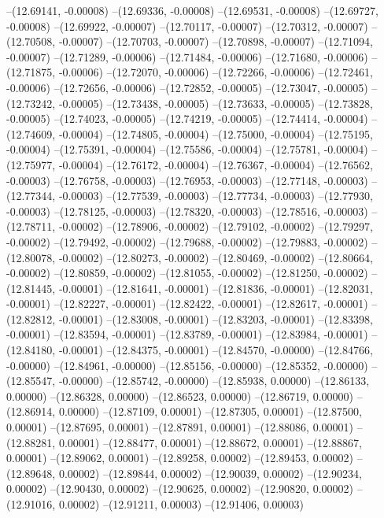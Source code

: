 --(12.69141, -0.00008)
--(12.69336, -0.00008)
--(12.69531, -0.00008)
--(12.69727, -0.00008)
--(12.69922, -0.00007)
--(12.70117, -0.00007)
--(12.70312, -0.00007)
--(12.70508, -0.00007)
--(12.70703, -0.00007)
--(12.70898, -0.00007)
--(12.71094, -0.00007)
--(12.71289, -0.00006)
--(12.71484, -0.00006)
--(12.71680, -0.00006)
--(12.71875, -0.00006)
--(12.72070, -0.00006)
--(12.72266, -0.00006)
--(12.72461, -0.00006)
--(12.72656, -0.00006)
--(12.72852, -0.00005)
--(12.73047, -0.00005)
--(12.73242, -0.00005)
--(12.73438, -0.00005)
--(12.73633, -0.00005)
--(12.73828, -0.00005)
--(12.74023, -0.00005)
--(12.74219, -0.00005)
--(12.74414, -0.00004)
--(12.74609, -0.00004)
--(12.74805, -0.00004)
--(12.75000, -0.00004)
--(12.75195, -0.00004)
--(12.75391, -0.00004)
--(12.75586, -0.00004)
--(12.75781, -0.00004)
--(12.75977, -0.00004)
--(12.76172, -0.00004)
--(12.76367, -0.00004)
--(12.76562, -0.00003)
--(12.76758, -0.00003)
--(12.76953, -0.00003)
--(12.77148, -0.00003)
--(12.77344, -0.00003)
--(12.77539, -0.00003)
--(12.77734, -0.00003)
--(12.77930, -0.00003)
--(12.78125, -0.00003)
--(12.78320, -0.00003)
--(12.78516, -0.00003)
--(12.78711, -0.00002)
--(12.78906, -0.00002)
--(12.79102, -0.00002)
--(12.79297, -0.00002)
--(12.79492, -0.00002)
--(12.79688, -0.00002)
--(12.79883, -0.00002)
--(12.80078, -0.00002)
--(12.80273, -0.00002)
--(12.80469, -0.00002)
--(12.80664, -0.00002)
--(12.80859, -0.00002)
--(12.81055, -0.00002)
--(12.81250, -0.00002)
--(12.81445, -0.00001)
--(12.81641, -0.00001)
--(12.81836, -0.00001)
--(12.82031, -0.00001)
--(12.82227, -0.00001)
--(12.82422, -0.00001)
--(12.82617, -0.00001)
--(12.82812, -0.00001)
--(12.83008, -0.00001)
--(12.83203, -0.00001)
--(12.83398, -0.00001)
--(12.83594, -0.00001)
--(12.83789, -0.00001)
--(12.83984, -0.00001)
--(12.84180, -0.00001)
--(12.84375, -0.00001)
--(12.84570, -0.00000)
--(12.84766, -0.00000)
--(12.84961, -0.00000)
--(12.85156, -0.00000)
--(12.85352, -0.00000)
--(12.85547, -0.00000)
--(12.85742, -0.00000)
--(12.85938, 0.00000)
--(12.86133, 0.00000)
--(12.86328, 0.00000)
--(12.86523, 0.00000)
--(12.86719, 0.00000)
--(12.86914, 0.00000)
--(12.87109, 0.00001)
--(12.87305, 0.00001)
--(12.87500, 0.00001)
--(12.87695, 0.00001)
--(12.87891, 0.00001)
--(12.88086, 0.00001)
--(12.88281, 0.00001)
--(12.88477, 0.00001)
--(12.88672, 0.00001)
--(12.88867, 0.00001)
--(12.89062, 0.00001)
--(12.89258, 0.00002)
--(12.89453, 0.00002)
--(12.89648, 0.00002)
--(12.89844, 0.00002)
--(12.90039, 0.00002)
--(12.90234, 0.00002)
--(12.90430, 0.00002)
--(12.90625, 0.00002)
--(12.90820, 0.00002)
--(12.91016, 0.00002)
--(12.91211, 0.00003)
--(12.91406, 0.00003)
